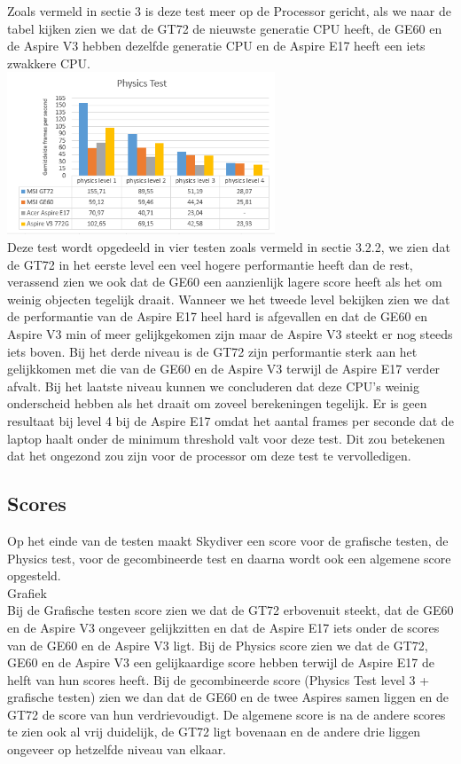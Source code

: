 Zoals vermeld in sectie 3 is deze test meer op de Processor gericht, als we naar de tabel kijken zien we dat de GT72 de nieuwste generatie CPU heeft, de GE60 en de Aspire V3 hebben dezelfde generatie CPU en de Aspire E17 heeft een iets zwakkere CPU.\\
\includegraphics[width=8cm]{physics}\\
Deze test wordt opgedeeld in vier testen zoals vermeld in sectie 3.2.2, we zien dat de GT72 in het eerste level een veel hogere performantie heeft dan de rest, verassend zien we ook dat de GE60 een aanzienlijk lagere score heeft als het om weinig objecten tegelijk draait.
Wanneer we het tweede level bekijken zien we dat de performantie van de Aspire E17 heel hard is afgevallen en dat de GE60 en Aspire V3 min of meer gelijkgekomen zijn maar de Aspire V3 steekt er nog steeds iets boven.
Bij het derde niveau is de GT72 zijn performantie sterk aan het gelijkkomen met die van de GE60 en de Aspire V3 terwijl de Aspire E17 verder afvalt.
Bij het laatste niveau kunnen we concluderen dat deze CPU's weinig onderscheid hebben als het draait om zoveel berekeningen tegelijk. Er is geen resultaat bij level 4 bij de Aspire E17 omdat het aantal frames per seconde dat de laptop haalt onder de minimum threshold valt voor deze test. Dit zou betekenen dat het ongezond zou zijn voor de processor om deze test te vervolledigen.

\subsection{Scores}
Op het einde  van de testen maakt Skydiver een score voor de grafische testen, de Physics test, voor de gecombineerde test en daarna wordt ook een algemene score opgesteld. \\
Grafiek\\
Bij de Grafische testen score zien we dat de GT72 erbovenuit steekt, dat de GE60 en de Aspire V3 ongeveer gelijkzitten en dat de Aspire E17 iets onder de scores van de GE60 en de Aspire V3 ligt.
Bij de Physics score zien we dat de GT72, GE60 en de Aspire V3 een gelijkaardige score hebben terwijl de Aspire E17 de helft van hun scores heeft.
Bij de gecombineerde score (Physics Test level 3 + grafische testen) zien we dan dat de GE60 en de twee Aspires samen liggen en de GT72 de score van hun verdrievoudigt.
De algemene score is na de andere scores te zien ook al vrij duidelijk, de GT72 ligt bovenaan en de andere drie liggen ongeveer op hetzelfde niveau van elkaar.